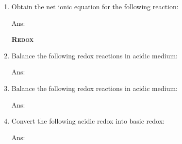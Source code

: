 \documentclass[main.tex]{subfiles}
\begin{document}
\begin{multicols*}{2}
\begin{enumerate}
\item Obtain the net ionic equation for the following reaction:
\begin{center}\end{center}
\begin{flushright}\small Ans:   \end{flushright}


{\raggedright\textsc{\textbf{Redox}}\par}

\item Balance the following redox reactions in acidic medium:
\begin{center}\end{center}
\begin{flushright}\small Ans:   \end{flushright}


\item Balance the following redox reactions in acidic medium:
\begin{center}\end{center}
\begin{flushright}\small Ans:   \end{flushright}

\item Convert the following acidic redox into basic redox:
\begin{center}\end{center}
\begin{flushright}\small Ans:   \end{flushright}



\restoregeometry
\end{enumerate}
\end{multicols*}
\pagecolor{green!10}\afterpage{\nopagecolor}\newpage
\end{document}
